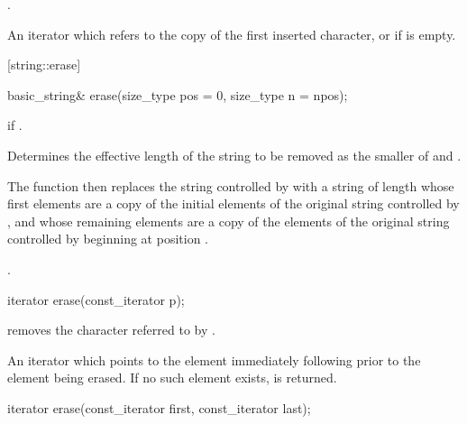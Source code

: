 \begin{itemdescr}
\pnum
\effects {}.

\pnum
\returns An iterator which refers to the copy of the first inserted character, or
 if  is empty.
\end{itemdescr}

[string::erase]{}

%
%
\begin{itemdecl}
basic_string& erase(size_type pos = 0, size_type n = npos);
\end{itemdecl}

\begin{itemdescr}
\pnum
\requires
{}

\pnum
\throws
{}
if 
.

\pnum
\effects
Determines the effective length 
of the string to be removed as the smaller of  and
.

\pnum
The function then replaces the string controlled by
with a string of length
whose first  elements are a copy of the initial elements of the original string controlled by
,
and whose remaining elements are a copy of the elements of the original string controlled by
beginning at position
.

\pnum
\returns
{}.
\end{itemdescr}

%
%
\begin{itemdecl}
iterator erase(const_iterator p);
\end{itemdecl}

\begin{itemdescr}
\pnum
\effects
removes the character referred to by .

\pnum
\returns
An iterator which points to the element immediately following  prior to
the element being erased.
If no such element exists,
is returned.
\end{itemdescr}

%
%
\begin{itemdecl}
iterator erase(const_iterator first, const_iterator last);
\end{itemdecl}

